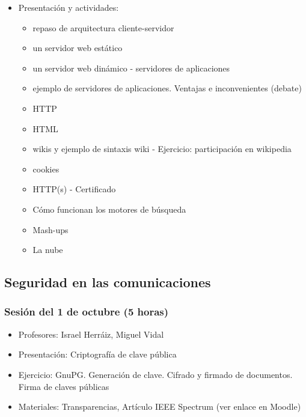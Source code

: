 \documentclass[a4paper,12pt]{article}
\begin{document}
\begin{itemize}
\item Presentación y actividades:
  \begin{itemize}
  \item repaso de arquitectura cliente-servidor
  \item un servidor web estático
  \item un servidor web dinámico - servidores de aplicaciones
  \item ejemplo de servidores de aplicaciones. Ventajas e inconvenientes (debate)
  \item HTTP
  \item HTML
  \item wikis y ejemplo de sintaxis wiki - Ejercicio: participación en wikipedia
  \item cookies
  \item HTTP(s) - Certificado
  \item Cómo funcionan los motores de búsqueda
  \item Mash-ups
  \item La nube
  \end{itemize}
\end{itemize}

\subsection{Seguridad en las comunicaciones}

\subsubsection{Sesión del 1 de octubre (5 horas)}

\begin{itemize}
\item Profesores: Israel Herr\'aiz, Miguel Vidal
\item Presentación: Criptografía de clave pública
\item Ejercicio: GnuPG. Generación de clave. Cifrado y firmado de
  documentos. Firma de claves públicas
\item Materiales: Transparencias, Artículo IEEE Spectrum (ver enlace
  en Moodle)
\end{itemize}




\end{document}
